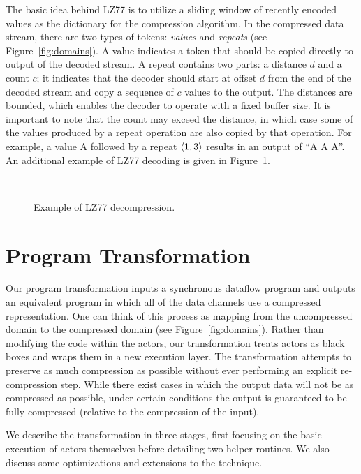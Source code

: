 The basic idea behind LZ77 is to utilize a sliding window of recently
encoded values as the dictionary for the compression algorithm.  In
the compressed data stream, there are two types of tokens: {\it
values} and {\it repeats} (see Figure~\ref{fig:domains}).  A value
indicates a token that should be copied directly to output of the
decoded stream.  A repeat contains two parts: a distance $d$ and a
count $c$; it indicates that the decoder should start at offset $d$
from the end of the decoded stream and copy a sequence of $c$ values
to the output.  The distances are bounded, which enables the decoder
to operate with a fixed buffer size.  It is important to note that the
count may exceed the distance, in which case some of the values
produced by a repeat operation are also copied by that operation.  For
example, a value A followed by a repeat $\langle1, 3\rangle$ results in an
output of ``A A A''.  An additional example of LZ77 decoding is given
in Figure~\ref{fig:lz77}.

\begin{figure}[t]
\begin{minipage}{0.21in}
\mbox{~}
\end{minipage}
\caption{Example of LZ77 decompression.
\protect\label{fig:lz77}}
\end{figure}

\section{Program Transformation}

Our program transformation inputs a synchronous dataflow program and
outputs an equivalent program in which all of the data channels use a
compressed representation.  One can think of this process as mapping
from the uncompressed domain to the compressed domain (see
Figure~\ref{fig:domains}).  Rather than modifying the code within the
actors, our transformation treats actors as black boxes and wraps them
in a new execution layer.  The transformation attempts to preserve as
much compression as possible without ever performing an explicit
re-compression step.  While there exist cases in which the output data
will not be as compressed as possible, under certain conditions the
output is guaranteed to be fully compressed (relative to the
compression of the input).

We describe the transformation in three stages, first focusing on the
basic execution of actors themselves before detailing two helper
routines.  We also discuss some optimizations and extensions to the
technique.

